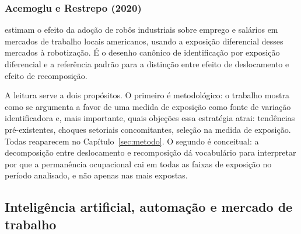 \subsubsection{Acemoglu e Restrepo (2020)}

 estimam o efeito da adoção de robôs industriais sobre
emprego e salários em mercados de trabalho locais americanos, usando a exposição
diferencial desses mercados à robotização. É o desenho canônico de identificação
por exposição diferencial e a referência padrão para a distinção entre efeito de
deslocamento e efeito de recomposição.

A leitura serve a dois propósitos. O primeiro é metodológico: o trabalho mostra
como se argumenta a favor de uma medida de exposição como fonte de variação
identificadora e, mais importante, quais objeções essa estratégia atrai:
tendências pré-existentes, choques setoriais concomitantes, seleção na medida de
exposição. Todas reaparecem no Capítulo~\ref{sec:metodo}. O segundo é conceitual:
a decomposição entre deslocamento e recomposição dá vocabulário para interpretar
por que a permanência ocupacional cai em todas as faixas de exposição no período
analisado, e não apenas nas mais expostas.

\subsection{Inteligência artificial, automação e mercado de trabalho}

